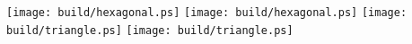 \texttt{[image: build/hexagonal.ps]}
\clearpage
\texttt{[image: build/hexagonal.ps]}
\clearpage
{}
\texttt{[image: build/triangle.ps]}
\clearpage
\texttt{[image: build/triangle.ps]}
\clearpage
